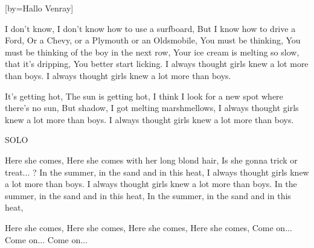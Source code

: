 

[by={Hallo Venray}]


\beginverse
I don't know,
I don't know how to use a surfboard,
But I know how to drive a Ford, Or a Chevy, or a Plymouth or an Oldsmobile,
You must be thinking,
You must be thinking of the boy in the next row,
Your ice cream is melting so slow, that it's dripping,
You better start licking.
I always thought girls knew a lot more than boys.
I always thought girls knew a lot more than boys.
\endverse

\beginverse
It's getting hot,
The sun is getting hot,
I think I look for a new spot where there's no sun,
But shadow, I got melting marshmellows,
I always thought girls knew a lot more than boys.
I always thought girls knew a lot more than boys.
\endverse

\beginchorus
SOLO
\endchorus


\beginverse
Here she comes,
Here she comes with her long blond hair,
Is she gonna trick or treat... ?
In the summer, in the sand and in this heat,
I always thought girls knew a lot more than boys.
I always thought girls knew a lot more than boys.
In the summer, in the sand and in this heat,
In the summer, in the sand and in this heat,

Here she comes, Here she comes, Here she comes, Here she comes,
Come on... Come on... Come on...
\endverse


\endsong

